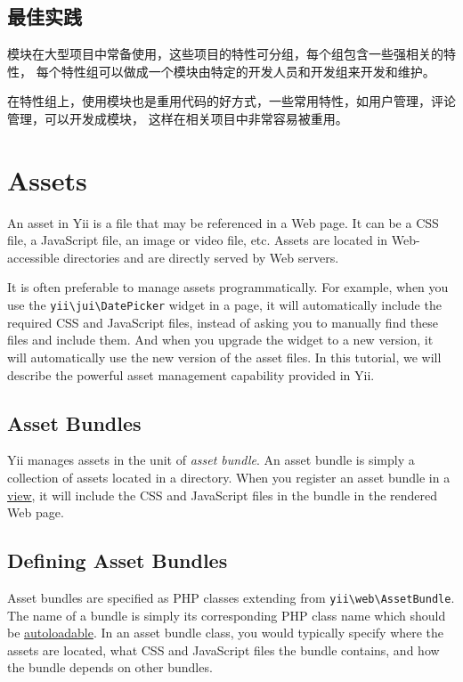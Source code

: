 \subsection{最佳实践 \label{structure-modules.md::best-practices}}
模块在大型项目中常备使用，这些项目的特性可分组，每个组包含一些强相关的特性，
每个特性组可以做成一个模块由特定的开发人员和开发组来开发和维护。

在特性组上，使用模块也是重用代码的好方式，一些常用特性，如用户管理，评论管理，可以开发成模块，
这样在相关项目中非常容易被重用。



\label{structure-assets.md}\section{Assets}
An asset in Yii is a file that may be referenced in a Web page. It can be a CSS file, a JavaScript file, an image
or video file, etc. Assets are located in Web-accessible directories and are directly served by Web servers.

It is often preferable to manage assets programmatically. For example, when you use the \texttt{yii{\allowbreak{}\textbackslash}jui{\allowbreak{}\textbackslash}DatePicker} widget
in a page, it will automatically include the required CSS and JavaScript files, instead of asking you to manually
find these files and include them. And when you upgrade the widget to a new version, it will automatically use
the new version of the asset files. In this tutorial, we will describe the powerful asset management capability
provided in Yii.

\subsection{Asset Bundles \label{structure-assets.md::asset-bundles}}
Yii manages assets in the unit of \textit{asset bundle}. An asset bundle is simply a collection of assets located
in a directory. When you register an asset bundle in a \hyperref[structure-views.md]{view}, it will include the CSS and
JavaScript files in the bundle in the rendered Web page.

\subsection{Defining Asset Bundles \label{structure-assets.md::defining-asset-bundles}}
Asset bundles are specified as PHP classes extending from \texttt{yii{\allowbreak{}\textbackslash}web{\allowbreak{}\textbackslash}AssetBundle}. The name of a bundle is simply
its corresponding PHP class name which should be \hyperref[concept-autoloading.md]{autoloadable}. In an asset bundle class,
you would typically specify where the assets are located, what CSS and JavaScript files the bundle contains, and
how the bundle depends on other bundles.

